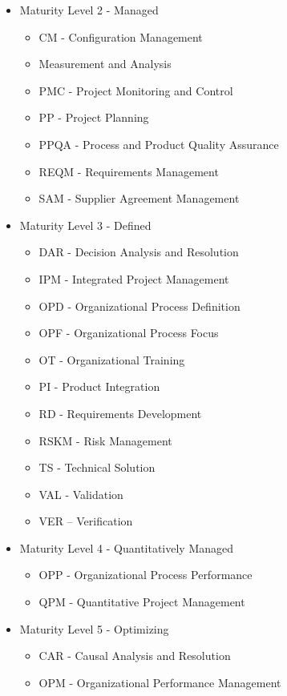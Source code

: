 \begin{itemize}
	\item Maturity Level 2 - Managed
	\begin{itemize}
		\item CM - Configuration Management
		\item Measurement and Analysis
		\item PMC - Project Monitoring and Control
		\item PP - Project Planning
		\item PPQA - Process and Product Quality Assurance
		\item REQM - Requirements Management
		\item SAM - Supplier Agreement Management

	\end{itemize}
	\item Maturity Level 3 - Defined
	\begin{itemize}
		\item DAR - Decision Analysis and Resolution
		\item IPM - Integrated Project Management
		\item OPD - Organizational Process Definition
		\item OPF - Organizational Process Focus
		\item OT - Organizational Training
		\item PI - Product Integration
		\item RD - Requirements Development
		\item RSKM - Risk Management
		\item TS - Technical Solution
		\item VAL - Validation
		\item VER – Verification	
	\end{itemize}
	\item Maturity Level 4 - Quantitatively Managed
	\begin{itemize}
		\item OPP - Organizational Process Performance
		\item QPM - Quantitative Project Management		
	\end{itemize}
	\item Maturity Level 5 - Optimizing
	\begin{itemize}
	\item CAR - Causal Analysis and Resolution
	\item OPM - Organizational Performance Management
	\end{itemize}
\end{itemize}


